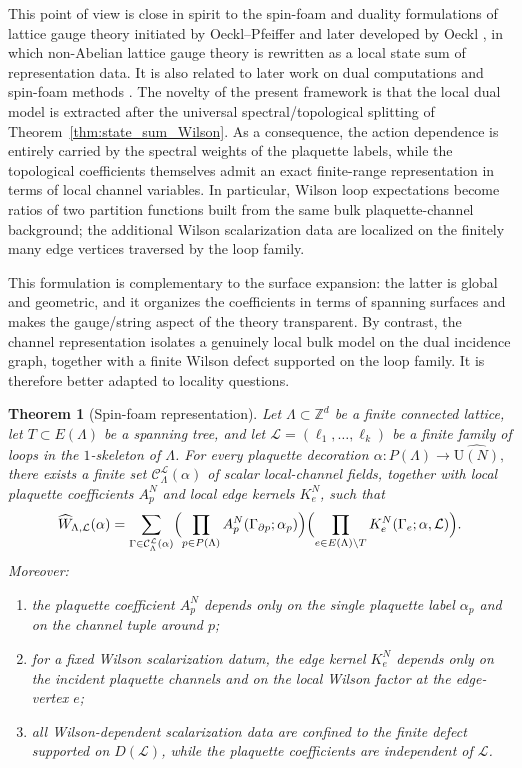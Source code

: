 \documentclass[11pt,a4paper,reqno]{article}
\newtheorem{theorem}{Theorem}[section]
\theoremstyle{definition}
\theoremstyle{remark}
\newcommand\U{{\mathrm U}}
\newcommand\Lc{{\mathcal{L}}}
\begin{document}
This point of view is close in spirit to the spin-foam and duality formulations of lattice gauge theory initiated by Oeckl--Pfeiffer \cite{OeckPfei01} and later developed by Oeckl \cite{Oec03}, in which non-Abelian lattice gauge theory is rewritten as a local state sum of representation data. It is also related to later work on dual computations and spin-foam methods \cite{CCK07}. The novelty of the present framework is that the local dual model is extracted after the universal spectral/topological splitting of Theorem~\ref{thm:state_sum_Wilson}. As a consequence, the action dependence is entirely carried by the spectral weights of the plaquette labels, while the topological coefficients themselves admit an exact finite-range representation in terms of local channel variables. In particular, Wilson loop expectations become ratios of two partition functions built from the same bulk plaquette-channel background; the additional Wilson scalarization data are localized on the finitely many edge vertices traversed by the loop family.

This formulation is complementary to the surface expansion: the latter is global and geometric, and it organizes the coefficients in terms of spanning surfaces and makes the gauge/string aspect of the theory transparent. By contrast, the channel representation isolates a genuinely local bulk model on the dual incidence graph, together with a finite Wilson defect supported on the loop family. It is therefore better adapted to locality questions.

\begin{theorem}[Spin-foam representation]\label{thm:spin-foam}
Let $\Lambda\subset \mathbb Z^d$ be a finite connected lattice, let $T\subset E(\Lambda)$ be a spanning tree, and let $\Lc=(\ell_1,\dots,\ell_k)$ be a finite family of loops in the $1$-skeleton of $\Lambda$. For every plaquette decoration $\alpha:P(\Lambda)\to \widehat{\U(N)},$ there exists a finite set $\mathcal C^\Lc_\Lambda(\alpha)$ of scalar local-channel fields, together with local plaquette coefficients $A_p^N$ and local edge kernels $K_e^N$, such that
\begin{equation}
\widehat W_{\Lambda,\Lc}(\alpha)=\sum_{\Gamma\in \mathcal C^\Lc_\Lambda(\alpha)}
\Bigl(\prod_{p\in P(\Lambda)}A_p^N(\Gamma_{\partial p};\alpha_p)\Bigr)
\Bigl(\prod_{e\in E(\Lambda)\setminus T}K_e^N(\Gamma_e;\alpha,\Lc)\Bigr).
\end{equation}
Moreover:
\begin{enumerate}
\item the plaquette coefficient $A_p^N$ depends only on the single plaquette label $\alpha_p$ and on the channel tuple around $p$;
\item for a fixed Wilson scalarization datum, the edge kernel $K_e^N$ depends only on the incident plaquette channels and on the local Wilson factor at the edge-vertex $e$;
\item all Wilson-dependent scalarization data are confined to the finite defect supported on $D(\Lc)$, while the plaquette coefficients are independent of $\Lc$.
\end{enumerate}
\end{theorem}
\end{document}
